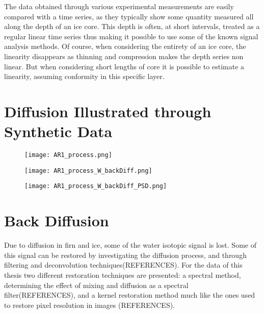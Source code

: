 \documentclass[../../CompleteThesis2/Complete_2ndDraft]{subfiles}
\begin{document}
The data obtained through various experimental measurements are easily compared with a time series, as they typically show some quantity measured all along the depth of an ice core. This depth is often, at short intervals, treated as a regular linear time series thus making it possible to use some of the known signal analysis methods. Of course, when considering the entirety of an ice core, the linearity disappears as thinning and compression makes the depth series non linear. But when considering short lengths of core it is possible to estimate a linearity, assuming conformity in this specific layer. 

\section[Synthetic Data]{Diffusion Illustrated through Synthetic Data}
\label{Sec:SignalAnalysis_SyntheticData}

\begin{figure}[h]
	\centering
	\texttt{[image: AR1\_process.png]}
	\caption[]{}
	\label{fig:AR1_process}
\end{figure}

\begin{figure}[h]
	\centering
	\texttt{[image: AR1\_process\_W\_backDiff.png]}
	\caption[]{}
	\label{fig:AR1_process_W_backDiff}
\end{figure}

\begin{figure}[h]
	\centering
	\texttt{[image: AR1\_process\_W\_backDiff\_PSD.png]}
	\caption[]{}
	\label{fig:AR1_process_W_backDiff_PSD}
\end{figure}








\section[Back Diffusion][Back Diffusion]{Back Diffusion}
\label{Sec:SignalAnalysis_BackDiffusion}
Due to diffusion in firn and ice, some of the water isotopic signal is lost. Some of this signal can be restored by investigating the diffusion process, and through filtering and deconvolution techniques(REFERENCES).
For the data of this thesis two different restoration techniques are presented: a spectral method, determining the effect of mixing and diffusion as a spectral filter(REFERENCES), and a kernel restoration method much like the ones used to restore pixel resolution in images (REFERENCES). 
\end{document}
